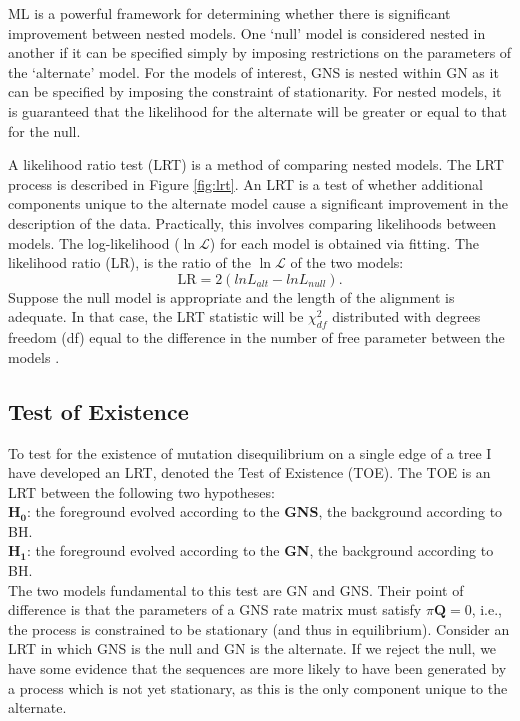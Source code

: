 ML is a powerful framework for determining whether there is significant improvement between \gls{nested} models. One `null' model is considered nested in another if it can be specified simply by imposing restrictions on the parameters of the `alternate' model.  For the models of interest, GNS is nested within GN as it can be specified by imposing the constraint of stationarity. For nested models, it is guaranteed that the likelihood for the alternate will be greater or equal to that for the null. 

A likelihood ratio test (LRT) is a method of comparing nested models. The LRT process is described in Figure \ref{fig:lrt}. An LRT is a test of whether additional components unique to the alternate model cause a significant improvement in the description of the data. Practically, this involves comparing likelihoods between models. The log-likelihood ($\ln\mathcal{L}$) for each model is obtained via fitting. The likelihood ratio (LR), is the ratio of the $\ln\mathcal{L}$ of the two models:
$$\mathrm{LR} = 2( ln L_{alt} -  ln L_{null}).$$
Suppose the null model is appropriate and the length of the alignment is adequate. In that case, the LRT statistic will be $\chi^2_{df}$ distributed with degrees freedom (df) equal to the difference in the number of free parameter between the models \citep{Lindgren1993StatisticalTheory, Silvey1975StatisticalInference, Kendall1979The2}.



\subsection{Test of Existence}

To test for the existence of mutation disequilibrium on a single edge of a tree I have developed an LRT, denoted the Test of Existence (TOE). The TOE is an LRT between the following two hypotheses: \\ $\mathbf{H_0}$: the foreground evolved according to the \textbf{GNS}, the background according to BH. \\ $\mathbf{H_1}$: the foreground evolved according to the \textbf{GN}, the background according to BH.\\ 
The two models fundamental to this test are GN and GNS. Their point of difference is that the parameters of a GNS rate matrix must satisfy $\pi\mathbf{Q}=0$, i.e., the process is constrained to be stationary (and thus in equilibrium). Consider an LRT in which GNS is the null and GN is the alternate. If we reject the null, we have some evidence that the sequences are more likely to have been generated by a process which is not yet stationary, as this is the only component unique to the alternate.

